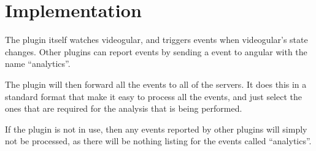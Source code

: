 \section{Implementation}

The plugin itself watches videogular, and triggers events when videogular's state changes. Other plugins can report events by sending a event to angular with the name ``analytics''.

The plugin will then forward all the events to all of the servers. It does this in a standard format that make it easy to process all the events, and just select the ones that are required for the analysis that is being performed.

If the plugin is not in use, then any events reported by other plugins will simply not be processed, as there will be nothing listing for the events called ``analytics''.

